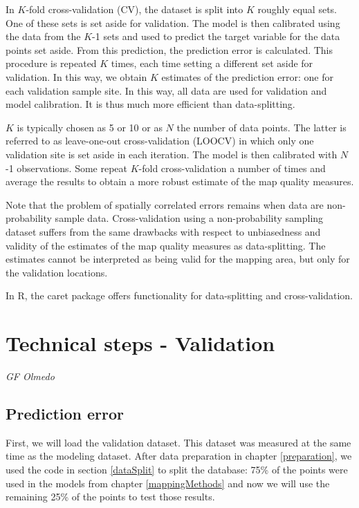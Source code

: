 \documentclass[10pt,b5paper,]{book}
\theoremstyle{definition}
\theoremstyle{definition}
\theoremstyle{definition}
\theoremstyle{remark}
\begin{document}
In \(K\)-fold cross-validation (CV), the dataset is split into \(K\)
roughly equal sets. One of these sets is set aside for validation. The
model is then calibrated using the data from the \(K\)-1 sets and used
to predict the target variable for the data points set aside. From this
prediction, the prediction error is calculated. This procedure is
repeated \(K\) times, each time setting a different set aside for
validation. In this way, we obtain \(K\) estimates of the prediction
error: one for each validation sample site. In this way, all data are
used for validation and model calibration. It is thus much more
efficient than data-splitting.

\(K\) is typically chosen as 5 or 10 or as \(N\) the number of data
points. The latter is referred to as leave-one-out cross-validation
(LOOCV) in which only one validation site is set aside in each
iteration. The model is then calibrated with \(N\)-1 observations. Some
repeat \(K\)-fold cross-validation a number of times and average the
results to obtain a more robust estimate of the map quality measures.

Note that the problem of spatially correlated errors remains when data
are non-probability sample data. Cross-validation using a
non-probability sampling dataset suffers from the same drawbacks with
respect to unbiasedness and validity of the estimates of the map quality
measures as data-splitting. The estimates cannot be interpreted as being
valid for the mapping area, but only for the validation locations.

In R, the caret package \citep{kuhn2016short} offers functionality for
data-splitting and cross-validation.

\hypertarget{TS:validation}{%
\section{Technical steps - Validation}\label{TS:validation}}

\emph{GF Olmedo}

\hypertarget{prediction-error}{%
\subsection{Prediction error}\label{prediction-error}}

First, we will load the validation dataset. This dataset was measured at
the same time as the modeling dataset. After data preparation in chapter
\ref{preparation}, we used the code in section \ref{dataSplit} to split
the database: 75\% of the points were used in the models from chapter
\ref{mappingMethods} and now we will use the remaining 25\% of the
points to test those results.
\end{document}
